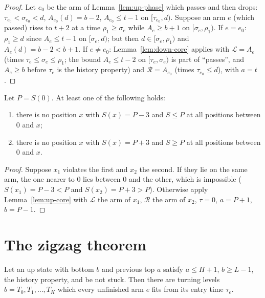 \begin{proof}
Let $e_0$ be the arm of Lemma~\ref{lem:up-phase} which passes and then drops: $\tau_{e_0}<\sigma_{e_0}<d$, $A_{e_0}(d)=b-2$, $A_{e_0}\le
t-1$ on $[\tau_{e_0},d)$. Suppose an arm $e$ (which passed) rises to $t+2$ at a time $\rho_1\ge\sigma_e$ while $A_e\ge b+1$ on
$[\sigma_e,\rho_1)$. If $e=e_0$: $\rho_1\ge d$ since $A_{e}\le t-1$ on $[\sigma_e,d)$; but then $d\in[\sigma_e,\rho_1)$ and $A_e(d)=b-2<b+1$.
If $e\ne e_0$: Lemma~\ref{lem:down-core} applies with $\mathcal L=A_e$ (times $\tau_e\le\sigma_e\le\rho_1$; the bound $A_e\le t-2$ on
$[\tau_e,\sigma_e)$ is part of ``passes'', and $A_e\ge b$ before $\tau_e$ is the history property) and $\mathcal R=A_{e_0}$ (times
$\tau_{e_0}\le d$), with $a=t$.
\end{proof}


\begin{lemma}\label{lem:first-direction}
Let $P=S(0)$. At least one of the following holds:
\begin{enumerate}
\item[$(\mathrm{OK}^-)$] there is no position $x$ with $S(x)=P-3$ and $S\le P$ at all positions between $0$ and $x$;
\item[$(\mathrm{OK}^+)$] there is no position $x$ with $S(x)=P+3$ and $S\ge P$ at all positions between $0$ and $x$.
\end{enumerate}
\end{lemma}

\begin{proof}
Suppose $x_1$ violates the first and $x_2$ the second. If they lie on the same arm, the one nearer to $0$ lies between $0$ and the
other, which is impossible ($S(x_1)=P-3<P$ and $S(x_2)=P+3>P$). Otherwise apply Lemma~\ref{lem:up-core} with $\mathcal L$ the arm of
$x_1$, $\mathcal R$ the arm of $x_2$, $\tau=0$, $a=P+1$, $b=P-1$.
\end{proof}


\section{The zigzag theorem}\label{sec:fold-zigzag}

\begin{proposition}\label{prop:main-up}
Let an up state with bottom $b$ and previous top $a$ satisfy $a\le H+1$, $b\ge L-1$, the history property, and be not stuck. Then
there are turning levels $b=T_0,T_1,\dots,T_K$ which every unfinished arm $e$ fits from its entry time $\tau_e$.
\end{proposition}

